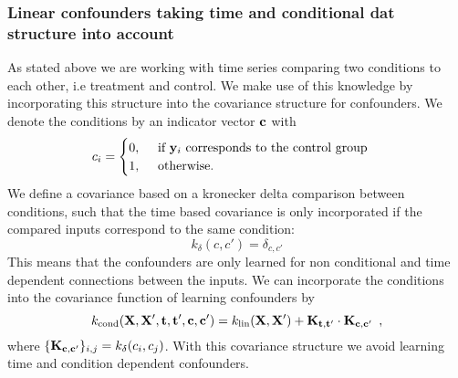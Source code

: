 \documentclass[11pt,a4paper,titlepage,twoside,tablecaptionabove]{article}
\begin{document}
\subsubsection{Linear confounders taking time and conditional dat structure into account}
\label{sec:line-conf-taking}

As stated above we are working with time series comparing two
conditions to each other, i.e treatment and control. We make use of
this knowledge by incorporating this structure into the covariance structure for 
confounders. We denote the conditions by an indicator vector $\bf c$ with
\begin{equation}
  \label{eq:8}
  c_i =
  \begin{cases}
    0,\quad\text{ if }{\bf y}_i \text{ corresponds to the control group}\\
    1,\quad\text{ otherwise.}
  \end{cases}
\end{equation}
We define a covariance based on a kronecker delta comparison between
conditions, such that the time based covariance is only incorporated
if the compared inputs correspond to the same condition:
\begin{equation}
  \label{eq:10}
  k_\delta(c,c') = \delta_{c,c'}
\end{equation}
This means that the confounders are only learned for non conditional
and time dependent connections between the inputs.
We can incorporate the conditions into the covariance
function of learning confounders by
\begin{equation}
  \label{eq:9}
  k_\text{cond}({\bf X,X',t,t',c,c'}) = k_\text{lin}({\bf
    X,X'}) + {\bf K_{\bf t,t'}} \cdot {\bf K_{\bf c,c'}}\enspace,
\end{equation}
where $\{ {\bf K_{c,c'}} \}_{i,j}=k_\delta(c_i,c_j)$.
With this covariance structure we avoid learning time and condition
dependent confounders.


 
\end{document}
